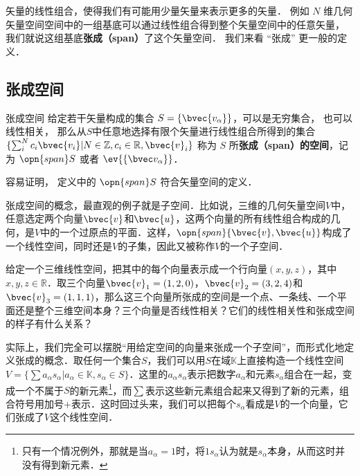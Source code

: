 
\begin{issues}
\issueTODO
\end{issues}


矢量的线性组合，使得我们有可能用少量矢量来表示更多的矢量． 例如 $N$ 维几何矢量空间空间中的一组基底可以通过线性组合得到整个矢量空间中的任意矢量， 我们就说这组基底\textbf{张成（span）}了这个矢量空间． 我们来看 “张成” 更一般的定义．

\subsection{张成空间}

\begin{definition}{张成空间}
给定若干矢量构成的集合 $S=\{\bvec{v_\alpha}\}$，可以是无穷集合， 也可以线性相关， 那么从$S$中任意地选择有限个矢量进行线性组合所得到的集合 $\{\sum_i^N c_i\bvec{v_i}|N\in\mathbb{Z}, c_i\in\mathbb{R}, \bvec{v}_i\}$ 称为 $S$ 所\textbf{张成（span）的空间}，记为 $\opn{span} S$ 或者 $\ev{\{\bvec v_\alpha\}}$．
\end{definition}
容易证明， 定义中的 $\opn{span} S$ 符合矢量空间的定义．

张成空间的概念，最直观的例子就是子空间．比如说，三维的几何矢量空间$V$中，任意选定两个向量$\bvec{v}$和$\bvec{u}$，这两个向量的所有线性组合构成的几何，是$V$中的一个过原点的平面．这样，$\opn{span}\{\bvec{v}, \bvec{u}\}$构成了一个线性空间，同时还是$V$的子集，因此又被称作$V$的一个子空间．

\begin{exercise}{}\label{VecSpn_exe1}
给定一个三维线性空间，把其中的每个向量表示成一个行向量$(x,y,z)$，其中$x,y,z\in\mathbb{R}$．取三个向量$\bvec{v}_1=(1,2,0)$，$\bvec{v}_2=(3,2,4)$和$\bvec{v}_3=(1,1,1)$，那么这三个向量所张成的空间是一个点、一条线、一个平面还是整个三维空间本身？三个向量是否线性相关？它们的线性相关性和张成空间的样子有什么关系？
\end{exercise}

实际上，我们完全可以摆脱“用给定空间的向量来张成一个子空间”，而形式化地定义张成的概念．取任何一个集合$S$，我们可以用$S$在域$\mathbb{K}$上直接构造一个线性空间$V=\{\sum a_\alpha s_\alpha|a_\alpha\in\mathbb{K}, s_\alpha\in S\}$．这里的$a_\alpha s_\alpha$表示把数字$a_\alpha$和元素$s_\alpha$组合在一起，变成一个不属于$S$的新元素\footnote{只有一个情况例外，那就是当$a_\alpha=1$时，将$1s_\alpha$认为就是$s_\alpha$本身，从而这时并没有得到新元素．}，而$\sum$表示这些新元素组合起来又得到了新的元素，组合符号用加号$+$表示．这时回过头来，我们可以把每个$s_\alpha$看成是$V$的一个向量，它们张成了$V$这个线性空间．

